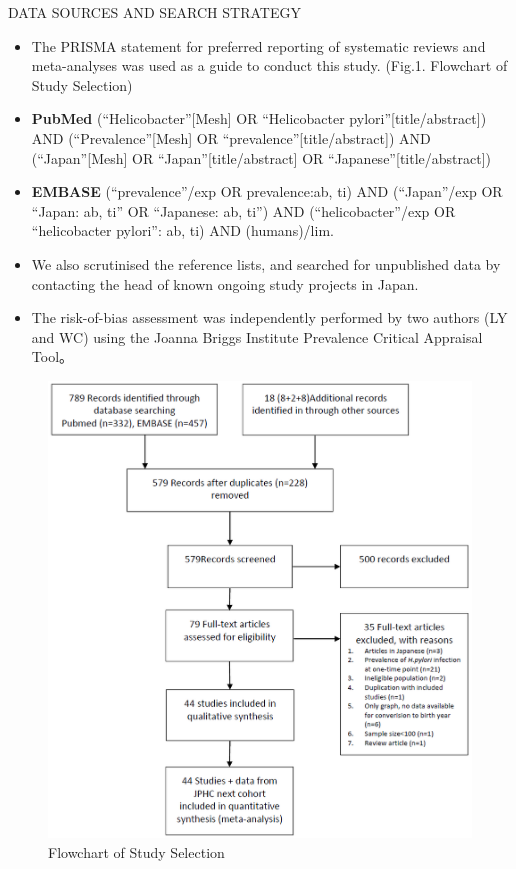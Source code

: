 \documentclass[english,xcolor=table,t
]{beamer}
\begin{document}
\begin{frame}
\begin{columns}
\begin{block}{DATA SOURCES AND SEARCH STRATEGY}
\begin{itemize}
\item
  The PRISMA statement for preferred reporting of systematic reviews and
  meta-analyses was used as a guide to conduct this study. (Fig.1.
  Flowchart of Study Selection)
\item
  \textbf{PubMed } (\enquote{Helicobacter}{[}Mesh{]} OR
  \enquote{Helicobacter pylori}{[}title/abstract{]}) AND
  (\enquote{Prevalence}{[}Mesh{]} OR
  \enquote{prevalence}{[}title/abstract{]}) AND
  (\enquote{Japan}{[}Mesh{]} OR \enquote{Japan}{[}title/abstract{]} OR
  \enquote{Japanese}{[}title/abstract{]})
\item
  \textbf{EMBASE } (\enquote{prevalence}/exp OR prevalence:ab, ti) AND
  (\enquote{Japan}/exp OR \enquote{Japan: ab, ti} OR \enquote{Japanese:
  ab, ti}) AND (\enquote{helicobacter}/exp OR \enquote{helicobacter
  pylori}: ab, ti) AND (humans)/lim.
\item
  We also scrutinised the reference lists, and searched for unpublished
  data by contacting the head of known ongoing study projects in Japan.
\item
  The risk-of-bias assessment was independently performed by two authors
  (LY and WC) using the Joanna Briggs Institute Prevalence Critical
  Appraisal Tool。
\end{itemize}

\begin{figure}
\includegraphics[]{images/Figure_1.png}
\caption{Flowchart of Study Selection}
\end{figure}


\end{block}
\end{columns}
\end{frame}
\end{document}
